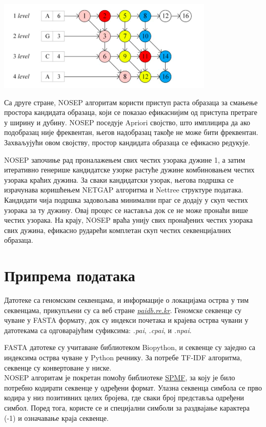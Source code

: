 \documentclass[12pt]{article}
\begin{document}
\begin{center}
\includegraphics[width=0.6\linewidth]{images/nettree.png}
\end{center}

Са друге стране, NOSEP алгоритам користи приступ раста образаца за смањење простора кандидата образаца, који се показао ефикаснијим од приступа претраге у ширину и дубину. NOSEP поседује Apriori својство, што имплицира да ако подобразац није фреквентан, његов надобразац такође не може бити фреквентан. Захваљујући овом својству, простор кандидата образаца се ефикасно редукује.

NOSEP започиње рад проналажењем свих честих узорака дужине 1, а затим итеративно генерише кандидатске узорке растуће дужине комбиновањем честих узорака краћих дужина. За сваки кандидатски узорак, његова подршка се израчунава коришћењем NETGAP алгоритма и Nettree структуре података. Кандидати чија подршка задовољава минимални праг се додају у скуп честих узорака за ту дужину. Овај процес се наставља док се не може пронаћи више честих узорака. На крају, NOSEP враћа унију свих пронађених честих узорака свих дужина, ефикасно рударећи комплетан скуп честих секвенцијалних образаца.


\section{Припрема података}

Датотеке са геномским секвенцама, и информације о локацијама острва у тим секвенцама, прикупљени су са веб стране \textit{\href{paidb.re.kr}{paidb.re.kr}}. Геномске секвенце су чуване у FASTA формату, док су индекси почетака и крајева острва чувани у датотекама са одговарајућим суфиксима: \textit{.pai}, \textit{.cpai}, и \textit{.npai}.

FASTA датотеке су учитаване библиотеком Biopython, и секвенце су заједно са индексима острва чуване у Python речнику. За потребе TF-IDF алгоритма, секвенце су конвертоване у ниске. \\

NOSEP алгоритам је покретан помоћу библиотеке \href{https://www.philippe-fournier-viger.com/spmf}{SPMF}, за коју је било потребно кодирати секвенце у одређени формат. Улазна секвенца симбола се прво кодира у низ позитивних целих бројева, где сваки број представља одређени симбол. Поред тога, користе се и специјални симболи за раздвајање карактера (-1) и означавање краја секвенце.
\end{document}
